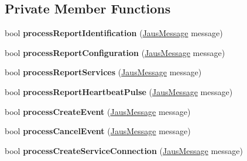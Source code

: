 \subsection*{\-Private \-Member \-Functions}
\begin{DoxyCompactItemize}
\item 
\hypertarget{class_node_manager_component_aebc68e9e6dacc47ba38f88842f5135b1}{bool {\bfseries process\-Report\-Identification} (\hyperlink{struct_jaus_message_struct}{\-Jaus\-Message} message)}\label{class_node_manager_component_aebc68e9e6dacc47ba38f88842f5135b1}

\item 
\hypertarget{class_node_manager_component_ab19d01f7baf845f4fb0e413815478b99}{bool {\bfseries process\-Report\-Configuration} (\hyperlink{struct_jaus_message_struct}{\-Jaus\-Message} message)}\label{class_node_manager_component_ab19d01f7baf845f4fb0e413815478b99}

\item 
\hypertarget{class_node_manager_component_a52b97615ea8831fa332cb2f71e3f6361}{bool {\bfseries process\-Report\-Services} (\hyperlink{struct_jaus_message_struct}{\-Jaus\-Message} message)}\label{class_node_manager_component_a52b97615ea8831fa332cb2f71e3f6361}

\item 
\hypertarget{class_node_manager_component_a218ea6424c692ab622a9a88dc7939d15}{bool {\bfseries process\-Report\-Heartbeat\-Pulse} (\hyperlink{struct_jaus_message_struct}{\-Jaus\-Message} message)}\label{class_node_manager_component_a218ea6424c692ab622a9a88dc7939d15}

\item 
\hypertarget{class_node_manager_component_a7417eee3de1eb1f230fd9cf11c307633}{bool {\bfseries process\-Create\-Event} (\hyperlink{struct_jaus_message_struct}{\-Jaus\-Message} message)}\label{class_node_manager_component_a7417eee3de1eb1f230fd9cf11c307633}

\item 
\hypertarget{class_node_manager_component_a8570f757815470af396ea628e4bf2684}{bool {\bfseries process\-Cancel\-Event} (\hyperlink{struct_jaus_message_struct}{\-Jaus\-Message} message)}\label{class_node_manager_component_a8570f757815470af396ea628e4bf2684}

\item 
\hypertarget{class_node_manager_component_a1d7b7b18182820d8098be0e2b136c20e}{bool {\bfseries process\-Create\-Service\-Connection} (\hyperlink{struct_jaus_message_struct}{\-Jaus\-Message} message)}\label{class_node_manager_component_a1d7b7b18182820d8098be0e2b136c20e}


\end{DoxyCompactItemize}
